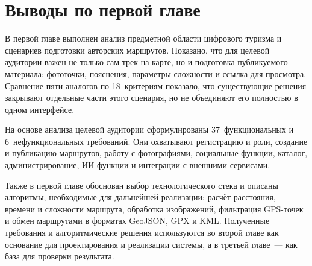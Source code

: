 

\section*{Выводы по первой главе}

В первой главе выполнен анализ предметной области цифрового туризма и
сценариев подготовки авторских маршрутов. Показано, что для целевой аудитории
важен не только сам трек на карте, но и подготовка публикуемого материала:
фототочки, пояснения, параметры сложности и ссылка для просмотра. Сравнение
пяти аналогов по 18~критериям показало, что существующие решения закрывают
отдельные части этого сценария, но не объединяют его полностью в одном
интерфейсе.

На основе анализа целевой аудитории сформулированы 37~функциональных и
6~нефункциональных требований. Они охватывают регистрацию и роли, создание и
публикацию маршрутов, работу с фотографиями, социальные функции, каталог,
администрирование, ИИ-функции и интеграции с внешними сервисами.

Также в первой главе обоснован выбор технологического стека и описаны
алгоритмы, необходимые для дальнейшей реализации: расчёт расстояния, времени и
сложности маршрута, обработка изображений, фильтрация GPS-точек и обмен
маршрутами в форматах GeoJSON, GPX и KML. Полученные требования и
алгоритмические решения используются во второй главе как основание для
проектирования и реализации системы, а в третьей главе~--- как база для
проверки результата.
